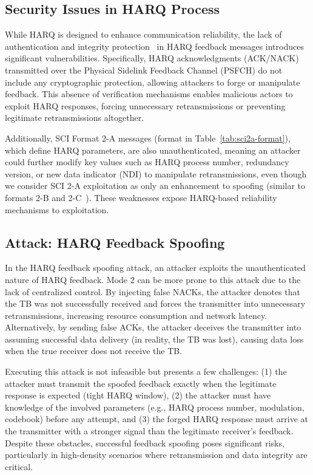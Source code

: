 \subsection{Security Issues in HARQ Process}

While HARQ is designed to enhance communication reliability, the lack of authentication and integrity protection~\cite{3gpp.37.985, 3gpp.33.536} in HARQ feedback messages introduces significant vulnerabilities. Specifically, HARQ acknowledgments (ACK/NACK) transmitted over the Physical Sidelink Feedback Channel (PSFCH) do not include any cryptographic protection, allowing attackers to forge or manipulate feedback. This absence of verification mechanisms enables malicious actors to exploit HARQ responses, forcing unnecessary retransmissions or preventing legitimate retransmissions altogether.

Additionally, SCI Format 2-A messages (format in Table~\ref{tab:sci2a-format}), which define HARQ parameters, are also unauthenticated, meaning an attacker could further modify key values such as HARQ process number, redundancy version, or new data indicator (NDI) to manipulate retransmissions, even though we consider SCI 2-A exploitation as only an enhancement to spoofing (similar to formats 2-B and 2-C~\cite{3gpp.38.212}). These weaknesses expose HARQ-based reliability mechanisms to exploitation.

\subsection{Attack: HARQ Feedback Spoofing}

In the HARQ feedback spoofing attack, an attacker exploits the unauthenticated nature of HARQ feedback. Mode 2 can be more prone to this attack due to the lack of centralized control. By injecting false NACKs, the attacker denotes that the TB was not successfully received and forces the transmitter into unnecessary retransmissions, increasing resource consumption and network latency. Alternatively, by sending false ACKs, the attacker deceives the transmitter into assuming successful data delivery (in reality, the TB was lost), causing data loss when the true receiver does not receive the TB.

Executing this attack is not infeasible but presents a few challenges: (1) the attacker must transmit the spoofed feedback exactly when the legitimate response is expected (tight HARQ window), (2) the attacker must have knowledge of the involved parameters (e.g., HARQ process number, modulation, codebook) before any attempt, and (3) the forged HARQ response must arrive at the transmitter with a stronger signal than the legitimate receiver’s feedback. Despite these obstacles, successful feedback spoofing poses significant risks, particularly in high-density scenarios where retransmission and data integrity are critical.

